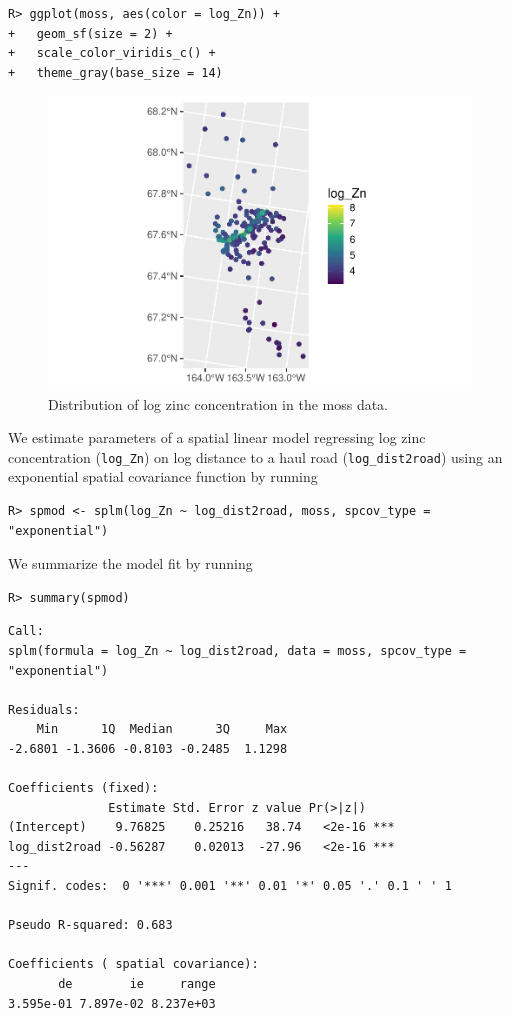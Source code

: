 \documentclass{article}
\begin{document}
\begin{verbatim}
R> ggplot(moss, aes(color = log_Zn)) +
+   geom_sf(size = 2) +
+   scale_color_viridis_c() +
+   theme_gray(base_size = 14)
\end{verbatim}

\begin{figure}

{\centering \includegraphics[width=0.65\linewidth]{preprint_files/figure-latex/log_zn-1} 

}

\caption{Distribution of log zinc concentration in the moss data.}\label{fig:log_zn}
\end{figure}

We estimate parameters of a spatial linear model regressing log zinc
concentration (\texttt{log\_Zn}) on log distance to a haul road
(\texttt{log\_dist2road}) using an exponential spatial covariance
function by running

\begin{verbatim}
R> spmod <- splm(log_Zn ~ log_dist2road, moss, spcov_type = "exponential")
\end{verbatim}

We summarize the model fit by running

\begin{verbatim}
R> summary(spmod)
\end{verbatim}

\begin{verbatim}
Call:
splm(formula = log_Zn ~ log_dist2road, data = moss, spcov_type = "exponential")

Residuals:
    Min      1Q  Median      3Q     Max 
-2.6801 -1.3606 -0.8103 -0.2485  1.1298 

Coefficients (fixed):
              Estimate Std. Error z value Pr(>|z|)    
(Intercept)    9.76825    0.25216   38.74   <2e-16 ***
log_dist2road -0.56287    0.02013  -27.96   <2e-16 ***
---
Signif. codes:  0 '***' 0.001 '**' 0.01 '*' 0.05 '.' 0.1 ' ' 1

Pseudo R-squared: 0.683

Coefficients ( spatial covariance):
       de        ie     range 
3.595e-01 7.897e-02 8.237e+03 
\end{verbatim}
\end{document}
